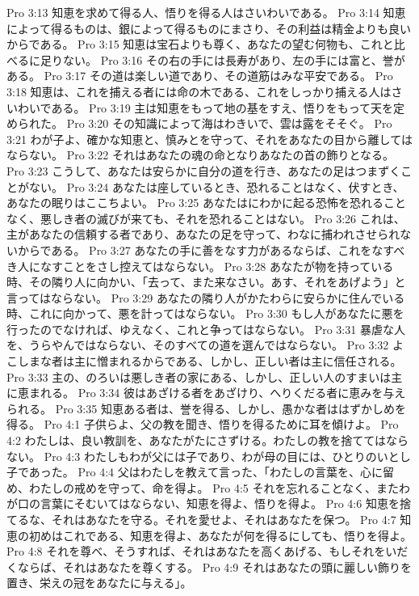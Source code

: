 Pro 3:13  知恵を求めて得る人、悟りを得る人はさいわいである。
Pro 3:14  知恵によって得るものは、銀によって得るものにまさり、その利益は精金よりも良いからである。
Pro 3:15  知恵は宝石よりも尊く、あなたの望む何物も、これと比べるに足りない。
Pro 3:16  その右の手には長寿があり、左の手には富と、誉がある。
Pro 3:17  その道は楽しい道であり、その道筋はみな平安である。
Pro 3:18  知恵は、これを捕える者には命の木である、これをしっかり捕える人はさいわいである。
Pro 3:19  主は知恵をもって地の基をすえ、悟りをもって天を定められた。
Pro 3:20  その知識によって海はわきいで、雲は露をそそぐ。
Pro 3:21  わが子よ、確かな知恵と、慎みとを守って、それをあなたの目から離してはならない。
Pro 3:22  それはあなたの魂の命となりあなたの首の飾りとなる。
Pro 3:23  こうして、あなたは安らかに自分の道を行き、あなたの足はつまずくことがない。
Pro 3:24  あなたは座しているとき、恐れることはなく、伏すとき、あなたの眠りはここちよい。
Pro 3:25  あなたはにわかに起る恐怖を恐れることなく、悪しき者の滅びが来ても、それを恐れることはない。
Pro 3:26  これは、主があなたの信頼する者であり、あなたの足を守って、わなに捕われさせられないからである。
Pro 3:27  あなたの手に善をなす力があるならば、これをなすべき人になすことをさし控えてはならない。
Pro 3:28  あなたが物を持っている時、その隣り人に向かい、「去って、また来なさい。あす、それをあげよう」と言ってはならない。
Pro 3:29  あなたの隣り人がかたわらに安らかに住んでいる時、これに向かって、悪を計ってはならない。
Pro 3:30  もし人があなたに悪を行ったのでなければ、ゆえなく、これと争ってはならない。
Pro 3:31  暴虐な人を、うらやんではならない、そのすべての道を選んではならない。
Pro 3:32  よこしまな者は主に憎まれるからである、しかし、正しい者は主に信任される。
Pro 3:33  主の、のろいは悪しき者の家にある、しかし、正しい人のすまいは主に恵まれる。
Pro 3:34  彼はあざける者をあざけり、へりくだる者に恵みを与えられる。
Pro 3:35  知恵ある者は、誉を得る、しかし、愚かな者ははずかしめを得る。
Pro 4:1  子供らよ、父の教を聞き、悟りを得るために耳を傾けよ。
Pro 4:2  わたしは、良い教訓を、あなたがたにさずける。わたしの教を捨ててはならない。
Pro 4:3  わたしもわが父には子であり、わが母の目には、ひとりのいとし子であった。
Pro 4:4  父はわたしを教えて言った、「わたしの言葉を、心に留め、わたしの戒めを守って、命を得よ。
Pro 4:5  それを忘れることなく、またわが口の言葉にそむいてはならない、知恵を得よ、悟りを得よ。
Pro 4:6  知恵を捨てるな、それはあなたを守る。それを愛せよ、それはあなたを保つ。
Pro 4:7  知恵の初めはこれである、知恵を得よ、あなたが何を得るにしても、悟りを得よ。
Pro 4:8  それを尊べ、そうすれば、それはあなたを高くあげる、もしそれをいだくならば、それはあなたを尊くする。
Pro 4:9  それはあなたの頭に麗しい飾りを置き、栄えの冠をあなたに与える」。
